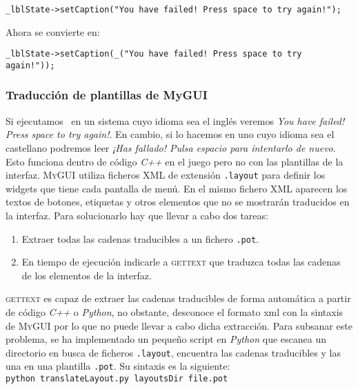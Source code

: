 \begin{lstlisting}[style=C++]
_lblState->setCaption("You have failed! Press space to try again!");
\end{lstlisting}

Ahora se convierte en:\\

\begin{lstlisting}[style=C++]
_lblState->setCaption(_("You have failed! Press space to try again!"));
\end{lstlisting}

\subsubsection{Traducción de plantillas de MyGUI}

Si ejecutamos \juego\ en un sistema cuyo idioma sea el inglés veremos
\textit{You have failed! Press space to try again!}. En cambio, si lo hacemos
en uno cuyo idioma sea el castellano podremos leer \textit{¡Has fallado!
Pulsa espacio para intentarlo de nuevo}. Esto funciona dentro de código
\textit{C++} en el juego pero no con las plantillas de la interfaz.
\textsc{MyGUI} utiliza ficheros XML de extensión \texttt{.layout} para definir
los widgets que tiene cada pantalla de menú. En el mismo fichero XML
aparecen los textos de botones, etiquetas y otros elementos que no se
mostrarán traducidos en la interfaz. Para solucionarlo hay que llevar
a cabo dos tareas:

\begin{enumerate}
    \itemsep0em
    \item Extraer todas las cadenas traducibles a un fichero \texttt{.pot}.
    \item En tiempo de ejecución indicarle a \textsc{gettext} que traduzca
    todas las cadenas de los elementos de la interfaz.
\end{enumerate}

\textsc{gettext} es capaz de extraer las cadenas traducibles de forma automática
a partir de código \textit{C++} o \textit{Python}, no obstante, desconoce
el formato xml con la sintaxis de \textsc{MyGUI} por lo que no puede llevar
a cabo dicha extracción. Para subsanar este problema, se ha implementado un
pequeño script en \textit{Python} que escanea un directorio en busca de
ficheros \texttt{.layout}, encuentra las cadenas traducibles y las una
en una plantilla \texttt{.pot}. Su sintaxis es la siguiente:\\

\texttt{python translateLayout.py layoutsDir file.pot}\\

